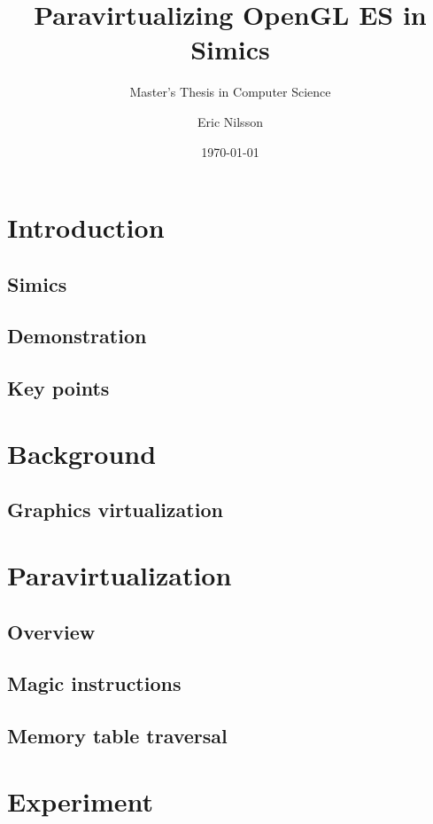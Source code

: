 \documentclass{beamer}
\title{Paravirtualizing OpenGL ES in Simics}
\subtitle{Master's Thesis in Computer Science}
\author{Eric Nilsson}
\institute{Blekinge Institute of Technology}
\date{\today} %
\begin{document}
	
	
	\section{Introduction}
	\subsection{Simics}
	
	\subsection{Demonstration}
	
	\subsection{Key points}
	

	\section{Background}
	\subsection{Graphics virtualization}
	

	\section{Paravirtualization}
	\subsection{Overview}
	
	\subsection{Magic instructions}
	\subsection{Memory table traversal}

	\section{Experiment}
\end{document}

